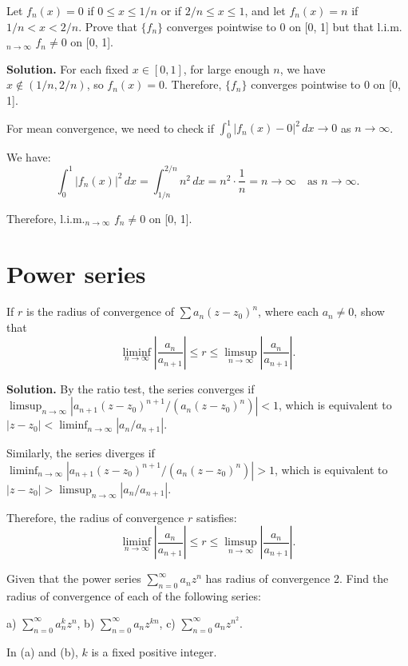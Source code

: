 \begin{problembox}
Let \( f_n(x) = 0 \) if \( 0 \leq x \leq 1/n \) or if \( 2/n \leq x \leq 1 \), and let \( f_n(x) = n \) if \( 1/n < x < 2/n \). Prove that \( \{f_n\} \) converges pointwise to 0 on [0, 1] but that l.i.m.\(_{n\to\infty}\) \( f_n \neq 0 \) on [0, 1].
\end{problembox}

\noindent\textbf{Solution.} For each fixed \( x \in [0, 1] \), for large enough \( n \), we have \( x \notin (1/n, 2/n) \), so \( f_n(x) = 0 \). Therefore, \( \{f_n\} \) converges pointwise to 0 on [0, 1].

For mean convergence, we need to check if \( \int_0^1 |f_n(x) - 0|^2 \, dx \to 0 \) as \( n \to \infty \).

We have:
\[\int_0^1 |f_n(x)|^2 \, dx = \int_{1/n}^{2/n} n^2 \, dx = n^2 \cdot \frac{1}{n} = n \to \infty \quad \text{as } n \to \infty.\]

Therefore, l.i.m.\(_{n\to\infty}\) \( f_n \neq 0 \) on [0, 1].

\section{Power series}

\begin{problembox}
If \( r \) is the radius of convergence of \( \sum a_n(z - z_0)^n \), where each \( a_n \neq 0 \), show that
\[ \liminf_{n\to\infty} \left| \frac{a_n}{a_{n+1}} \right| \leq r \leq \limsup_{n\to\infty} \left| \frac{a_n}{a_{n+1}} \right|.\]
\end{problembox}

\noindent\textbf{Solution.} By the ratio test, the series converges if \( \limsup_{n\to\infty} |a_{n+1}(z - z_0)^{n+1} / (a_n(z - z_0)^n)| < 1 \), which is equivalent to \( |z - z_0| < \liminf_{n\to\infty} |a_n/a_{n+1}| \).

Similarly, the series diverges if \( \liminf_{n\to\infty} |a_{n+1}(z - z_0)^{n+1} / (a_n(z - z_0)^n)| > 1 \), which is equivalent to \( |z - z_0| > \limsup_{n\to\infty} |a_n/a_{n+1}| \).

Therefore, the radius of convergence \( r \) satisfies:
\[\liminf_{n\to\infty} \left| \frac{a_n}{a_{n+1}} \right| \leq r \leq \limsup_{n\to\infty} \left| \frac{a_n}{a_{n+1}} \right|.\]

\begin{problembox}
Given that the power series \( \sum_{n=0}^{\infty} a_nz^n \) has radius of convergence 2. Find the radius of convergence of each of the following series:

a) \( \sum_{n=0}^{\infty} a_n^k z^n \),    b) \( \sum_{n=0}^{\infty} a_nz^{kn} \),    c) \( \sum_{n=0}^{\infty} a_nz^{n^2} \).

In (a) and (b), \( k \) is a fixed positive integer.
\end{problembox}


